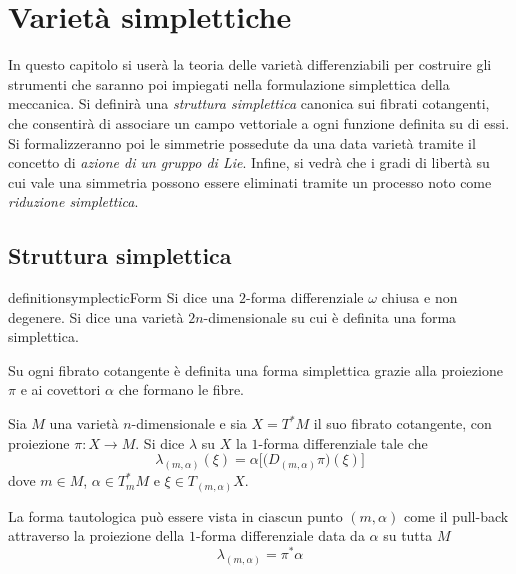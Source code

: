 \chapter{Varietà simplettiche}
In questo capitolo si userà la teoria delle varietà differenziabili per costruire gli strumenti che saranno poi impiegati nella formulazione simplettica della meccanica. Si definirà una \emph{struttura simplettica} canonica sui fibrati cotangenti, che consentirà di associare un campo vettoriale a ogni funzione definita su di essi. Si formalizzeranno poi le simmetrie possedute da una data varietà tramite il concetto di \emph{azione di un gruppo di Lie}. Infine, si vedrà che i gradi di libertà su cui vale una simmetria possono essere eliminati tramite un processo noto come \emph{riduzione simplettica}.

\section{Struttura simplettica}

\begin{restatable}{definition}{symplecticForm}
  Si dice  una $2$-forma differenziale $\omega$ chiusa e non degenere. Si dice  una varietà $2n$-dimensionale su cui è definita una forma simplettica.
\end{restatable}
Su ogni fibrato cotangente è definita una forma simplettica grazie alla proiezione $\pi$ e ai covettori $\alpha$ che formano le fibre.
\begin{definition}
  Sia $M$ una varietà $n$-dimensionale e sia $X = T^*M$ il suo fibrato cotangente, con proiezione $\pi:X\to M$. 
  Si dice  $\lambda$ su $X$ la $1$-forma differenziale tale che \begin{equation*}
  \lambda_{(m, \alpha)}(\xi) = \alpha \bigg[\big(D_{(m, \alpha)} \pi\big)(\xi)\bigg]
  \end{equation*} 
  dove $m \in M$, $\alpha \in T_m^* M$ e $\xi \in T_{(m,\alpha)}X$.
\end{definition}
\begin{remark}
La forma tautologica può essere vista in ciascun punto $(m,\alpha)$ come il pull-back attraverso la proiezione della $1$-forma differenziale data da $\alpha$ su tutta $M$
\begin{equation*}
  \lambda_{(m,\alpha)} = \pi^* \alpha
\end{equation*} 
\end{remark}


